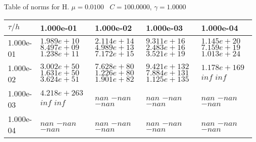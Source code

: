 \begin{center}
Table of norms for H. $\mu = 0.0100$ \, $C = 100.0000$, $\gamma = 1.0000$
  
\begin{tabular}{|p{1in}|p{1in}|p{1in}|p{1in}|p{1in}|} \hline
$\tau / h$ &1.000e-01 &1.000e-02 &1.000e-03 &1.000e-04 \\ \hline 
1.000e-01 & $1.989e+10$  $8.497e+09$  $1.238e+11$  & $2.114e+14$  $4.989e+13$  $7.172e+15$  & $9.311e+16$  $2.483e+16$  $3.521e+19$  & $1.145e+20$  $7.159e+19$  $1.013e+24$  \\ \hline 
1.000e-02 & $3.002e+50$  $1.631e+50$  $3.624e+51$  & $7.628e+80$  $1.226e+80$  $1.901e+82$  & $9.421e+132$  $7.884e+131$  $1.125e+135$  & $1.178e+169$  $inf$  $inf$  \\ \hline 
1.000e-03 & $4.218e+263$  $inf$  $inf$  & $nan$  $-nan$  $-nan$  & $nan$  $-nan$  $-nan$  & $nan$  $-nan$  $-nan$  \\ \hline 
1.000e-04 & $nan$  $-nan$  $-nan$  & $nan$  $-nan$  $-nan$  & $nan$  $-nan$  $-nan$  & $nan$  $-nan$  $-nan$  \\ \hline 

\end{tabular}\\[20pt]
\end{center}
